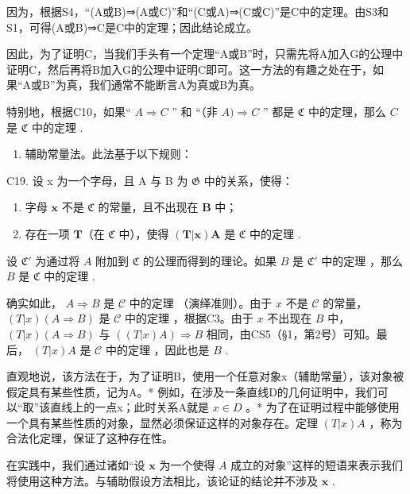 因为，根据S4，“(A或B)⇒(A或C)”和“(C或A)⇒(C或C)”是C中的定理。由S3和S1，可得(A或B)⇒C是C中的定理；因此结论成立。

因此，为了证明C，当我们手头有一个定理“A或B”时，只需先将A加入G的公理中证明C，然后再将B加入G的公理中证明C即可。这一方法的有趣之处在于，如果“A或B”为真，我们通常不能断言A为真或B为真。

特别地，根据C10，如果`` \(A \Rightarrow C\) '' 和 ``（非 \(A) \Rightarrow C\) '' 都是 \(\mathfrak{C}\) 中的定理，那么 \(C\) 是 \(\mathfrak{C}\) 中的定理 .

\begin{enumerate}
\def\labelenumi{\Roman{enumi}.}
\setcounter{enumi}{3}
\tightlist
\item
  辅助常量法。此法基于以下规则：
\end{enumerate}

C19. 设 x 为一个字母，且 A 与 B 为 \(\mathfrak{G}\) 中的关系，使得：

\begin{enumerate}
\def\labelenumi{(\arabic{enumi})}
\item
  字母 \(\pmb{x}\) 不是 \(\mathfrak{C}\) 的常量，且不出现在 \(\pmb{B}\) 中；
\item
  存在一项 \(\pmb{T}\)（在 \(\mathfrak{C}\) 中），使得 \((\pmb{T}|\pmb{x})\pmb{A}\) 是 \(\mathfrak{C}\) 中的定理 .
\end{enumerate}

设 \(\mathfrak{C}'\) 为通过将 \(A\) 附加到 \(\mathfrak{C}\) 的公理而得到的理论。如果 \(B\) 是 \(\mathfrak{C}'\) 中的定理 ，那么 \(B\) 是 \(\mathfrak{C}\) 中的定理 .

确实如此， \(A \Longrightarrow B\) 是 \(\mathcal{C}\) 中的定理 （演绎准则）。由于 \(x\) 不是 \(\mathcal{C}\) 的常量， \((T|x)(A \Longrightarrow B)\) 是 \(\mathcal{C}\) 中的定理 ，根据C3。由于 \(x\) 不出现在 \(B\) 中， \((T|x)(A \Longrightarrow B)\) 与 \(((T|x)A) \Longrightarrow B\) 相同，由CS5（§1，第2号）可知。最后， \((T|x)A\) 是 \(\mathcal{C}\) 中的定理 ，因此也是 \(B\) .

直观地说，该方法在于，为了证明B，使用一个任意对象x（辅助常量），该对象被假定具有某些性质，记为A。* 例如，在涉及一条直线D的几何证明中，我们可以“取”该直线上的一点x；此时关系A就是 \(x \in D\) 。* 为了在证明过程中能够使用一个具有某些性质的对象，显然必须保证这样的对象存在。定理 \((T|x)A\) ，称为合法化定理，保证了这种存在性。

在实践中，我们通过诸如“设 \(\pmb{x}\) 为一个使得 \(A\) 成立的对象”这样的短语来表示我们将使用这种方法。与辅助假设方法相比，该论证的结论并不涉及 \(\pmb{x}\) .

